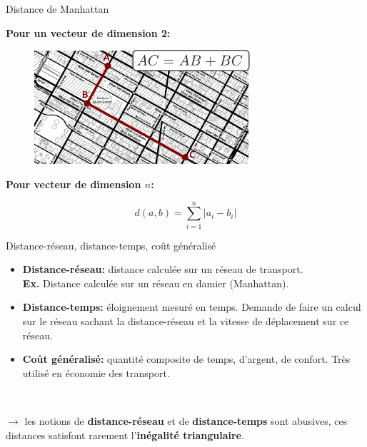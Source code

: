 \begin{frame}{Distance de Manhattan}

\textbf{Pour un vecteur de dimension 2:}

\begin{figure}
  \includegraphics[width=8cm]{DistancesMan.pdf}
\end{figure}

\textbf{Pour vecteur de dimension $n$:}

\begin{equation}
  \nonumber
  d(a,b) = \sum_{i=1}^n |a_i - b_i|
\end{equation}

\end{frame}


\begin{frame}{Distance-réseau, distance-temps, coût généralisé}

\begin{itemize}
  \item \textbf{Distance-réseau:} distance calculée sur un réseau de transport. \\ \textbf{Ex.} Distance calculée sur un réseau en damier (Manhattan).
  \item \textbf{Distance-temps:} éloignement mesuré en temps. Demande de faire un calcul sur le réseau sachant la distance-réseau et la vitesse de déplacement sur ce réseau.
  \item \textbf{Coût généralisé:} quantité composite de temps, d'argent, de confort. Très utilisé en économie des transport.
\end{itemize}

~

$\rightarrow$ les notions de \textbf{distance-réseau} et de \textbf{distance-temps} sont abusives, ces distances satisfont rarement l'\textbf{inégalité triangulaire}.

\end{frame}


